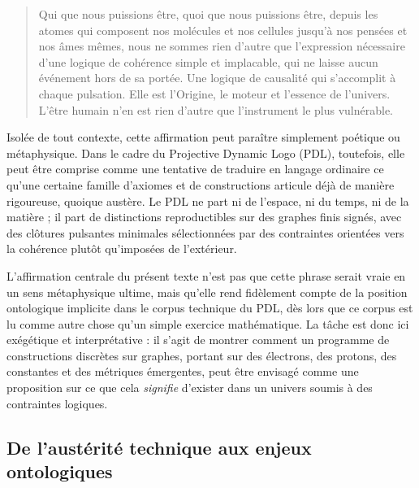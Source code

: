 \documentclass[11pt,a4paper]{article}
\theoremstyle{definition}
\begin{document}
\begin{quote}
Qui que nous puissions être, quoi que nous puissions être, depuis les atomes qui composent nos molécules et nos cellules jusqu’à nos pensées et nos âmes mêmes, nous ne sommes rien d’autre que l’expression nécessaire d’une logique de cohérence simple et implacable, qui ne laisse aucun événement hors de sa portée. Une logique de causalité qui s’accomplit à chaque pulsation. Elle est l’Origine, le moteur et l’essence de l’univers. L’être humain n’en est rien d’autre que l’instrument le plus vulnérable.
\end{quote}

Isolée de tout contexte, cette affirmation peut paraître simplement poétique ou métaphysique. Dans le cadre du Projective Dynamic Logo (PDL), toutefois, elle peut être comprise comme une tentative de traduire en langage ordinaire ce qu’une certaine famille d’axiomes et de constructions articule déjà de manière rigoureuse, quoique austère.\cite{Laubscher_IntroPDL_2024,Laubscher_EmergencePhysicalReality_2024,Laubscher_PDL_Position_2024} Le PDL ne part ni de l’espace, ni du temps, ni de la matière ; il part de distinctions reproductibles sur des graphes finis signés, avec des clôtures pulsantes minimales sélectionnées par des contraintes orientées vers la cohérence plutôt qu’imposées de l’extérieur.

L’affirmation centrale du présent texte n’est pas que cette phrase serait vraie en un sens métaphysique ultime, mais qu’elle rend fidèlement compte de la position ontologique implicite dans le corpus technique du PDL, dès lors que ce corpus est lu comme autre chose qu’un simple exercice mathématique. La tâche est donc ici exégétique et interprétative : il s’agit de montrer comment un programme de constructions discrètes sur graphes, portant sur des électrons, des protons, des constantes et des métriques émergentes, peut être envisagé comme une proposition sur ce que cela \emph{signifie} d’exister dans un univers soumis à des contraintes logiques.\cite{Laubscher_Existence_PulsatingClosure_2026,Laubscher_PDL_GlobalMapping_v6_2024}

\subsection{De l'austérité technique aux enjeux ontologiques}
\end{document}
